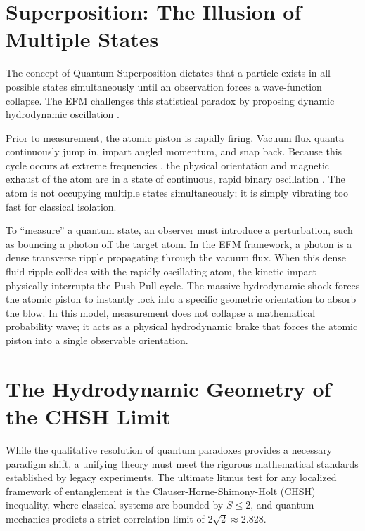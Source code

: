 \documentclass[11pt, a4paper]{article}
\begin{document}
\section{Superposition: The Illusion of Multiple States}
  The concept of Quantum Superposition dictates that a particle exists in all possible states simultaneously until an observation forces a wave-function collapse. The EFM challenges this statistical paradox by proposing dynamic hydrodynamic oscillation \cite{marabut2026m2}. 
  
  Prior to measurement, the atomic piston is rapidly firing. Vacuum flux quanta continuously jump in, impart angled momentum, and snap back. Because this cycle occurs at extreme frequencies \cite{marabut2026m4}, the physical orientation and magnetic exhaust of the atom are in a state of continuous, rapid binary oscillation \cite{marabut2026m9}. The atom is not occupying multiple states simultaneously; it is simply vibrating too fast for classical isolation.
  
  To ``measure'' a quantum state, an observer must introduce a perturbation, such as bouncing a photon off the target atom. In the EFM framework, a photon is a dense transverse ripple propagating through the vacuum flux. When this dense fluid ripple collides with the rapidly oscillating atom, the kinetic impact physically interrupts the Push-Pull cycle. The massive hydrodynamic shock \cite{marabut2026m6} forces the atomic piston to instantly lock into a specific geometric orientation to absorb the blow. In this model, measurement does not collapse a mathematical probability wave; it acts as a physical hydrodynamic brake that forces the atomic piston into a single observable orientation.

\section{The Hydrodynamic Geometry of the CHSH Limit}
  While the qualitative resolution of quantum paradoxes provides a necessary paradigm shift, a unifying theory must meet the rigorous mathematical standards established by legacy experiments. The ultimate litmus test for any localized framework of entanglement is the Clauser-Horne-Shimony-Holt (CHSH) inequality, where classical systems are bounded by $S \le 2$, and quantum mechanics predicts a strict correlation limit of $2\sqrt{2} \approx 2.828$.
  
\end{document}
